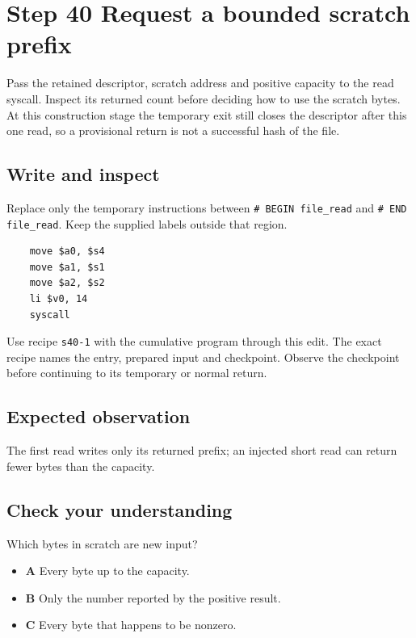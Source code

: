 \section{Step 40 Request a bounded scratch prefix}\label{sha-s40}

Pass the retained descriptor, scratch address and positive capacity to the read syscall. Inspect its returned count before deciding how to use the scratch bytes. At this construction stage the temporary exit still closes the descriptor after this one read, so a provisional return is not a successful hash of the file.

\subsection{Write and inspect}
Replace only the temporary instructions between \texttt{\# BEGIN file\_read} and \texttt{\# END file\_read}. Keep the supplied labels outside that region.

\begin{verbatim}
    move $a0, $s4
    move $a1, $s1
    move $a2, $s2
    li $v0, 14
    syscall
\end{verbatim}

Use recipe \texttt{s40-1} with the cumulative program through this edit. The exact recipe names the entry, prepared input and checkpoint. Observe the checkpoint before continuing to its temporary or normal return.

\subsection{Expected observation}
The first read writes only its returned prefix; an injected short read can return fewer bytes than the capacity.

\subsection{Check your understanding}
Which bytes in scratch are new input?

\begin{itemize}
  \item \textbf{A} Every byte up to the capacity.
  \item \textbf{B} Only the number reported by the positive result.
  \item \textbf{C} Every byte that happens to be nonzero.
\end{itemize}
